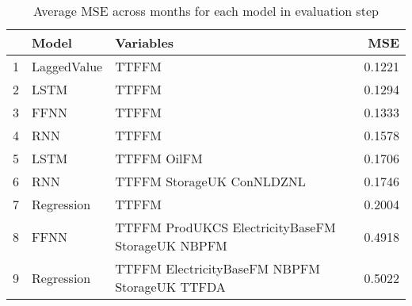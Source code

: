 \begin{table}[ht]
\centering
\begin{tabular}{rllr}
  \hline
 & Model & Variables & MSE \\ 
  \hline
1 & LaggedValue & TTFFM  & 0.1221 \\ 
  2 & LSTM & TTFFM  & 0.1294 \\ 
  3 & FFNN & TTFFM  & 0.1333 \\ 
  4 & RNN & TTFFM  & 0.1578 \\ 
  5 & LSTM & TTFFM OilFM & 0.1706 \\ 
  6 & RNN & TTFFM StorageUK ConNLDZNL & 0.1746 \\ 
  7 & Regression & TTFFM  & 0.2004 \\ 
  8 & FFNN & TTFFM ProdUKCS ElectricityBaseFM StorageUK NBPFM & 0.4918 \\ 
  9 & Regression & TTFFM ElectricityBaseFM NBPFM StorageUK TTFDA & 0.5022 \\ 
   \hline
\end{tabular}
\caption{Average MSE across months for each model in evaluation step} 
\label{tab:level.eval.short}
\end{table}
